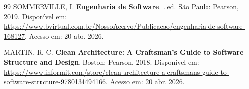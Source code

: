 \begin{thebibliography}{99}
SOMMERVILLE, I.
\newblock \textbf{Engenharia de Software}.
. ed. São Paulo: Pearson, 2019.
\newblock Disponível em: \url{https://www.bvirtual.com.br/NossoAcervo/Publicacao/engenharia-de-software-168127}.
\newblock Acesso em: 20 abr. 2026.

MARTIN, R. C.
\newblock \textbf{Clean Architecture: A Craftsman's Guide to Software Structure and Design}.
\newblock Boston: Pearson, 2018.
\newblock Disponível em: \url{https://www.informit.com/store/clean-architecture-a-craftsmans-guide-to-software-structure-9780134494166}.
\newblock Acesso em: 20 abr. 2026.

\end{thebibliography}
